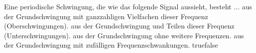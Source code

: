     {Eine periodische Schwingung, die wie das folgende Signal aussieht, besteht ...}
    {aus der Grundschwingung mit ganzzahligen Vielfachen dieser Frequenz (Oberschwingungen).}
    {aus der Grundschwingung und Teilen dieser Frequenz (Unterschwingungen).}
    {aus der Grundschwingung ohne weitere Frequenzen.}
    {aus der Grundschwingung mit zufälligen Frequenzschwankungen.}
    {true}{false}